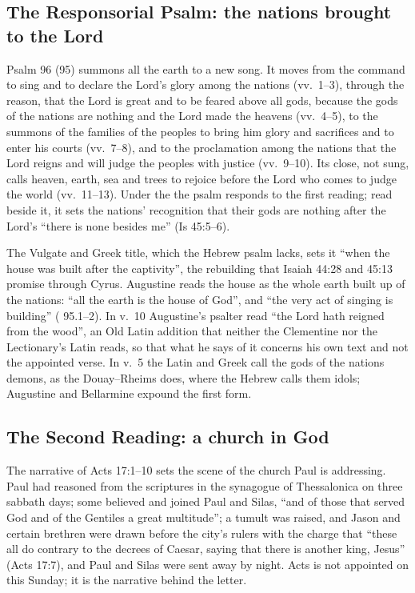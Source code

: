 \subsection{The Responsorial Psalm: the nations brought to the Lord}

Psalm 96 (95) summons all the earth to a new song. It moves from the command to
sing and to declare the Lord's glory among the nations (vv.~1--3), through the
reason, that the Lord is great and to be feared above all gods, because the
gods of the nations are nothing and the Lord made the heavens (vv.~4--5), to
the summons of the families of the peoples to bring him glory and sacrifices
and to enter his courts (vv.~7--8), and to the proclamation among the nations
that the Lord reigns and will judge the peoples with justice (vv.~9--10). Its
close, not sung, calls heaven, earth, sea and trees to rejoice before the Lord
who comes to judge the world (vv.~11--13). Under the  the psalm responds to the first reading; read beside it, it sets
the nations' recognition that their gods are nothing after the Lord's ``there
is none besides me'' (Is 45:5--6).

The Vulgate and Greek title, which the Hebrew psalm lacks, sets it ``when the
house was built after the captivity'', the rebuilding that Isaiah 44:28 and
45:13 promise through Cyrus. Augustine reads the house as the whole earth
built up of the nations: ``all the earth is the house of God'', and ``the very
act of singing is building'' ( 95.1--2). In
v.~10 Augustine's psalter read ``the Lord hath reigned from the wood'', an Old
Latin addition that neither the Clementine nor the Lectionary's Latin reads,
so that what he says of it concerns his own text and not the appointed verse.
In v.~5 the Latin and Greek call the gods of the nations demons, as the
Douay--Rheims does, where the Hebrew calls them idols; Augustine and
Bellarmine expound the first form.

\subsection{The Second Reading: a church in God}

The narrative of Acts 17:1--10 sets the scene of the church Paul is
addressing. Paul had reasoned from the scriptures in the synagogue of
Thessalonica on three sabbath days; some believed and joined Paul and Silas,
``and of those that served God and of the Gentiles a great multitude''; a
tumult was raised, and Jason and certain brethren were drawn before the city's
rulers with the charge that ``these all do
contrary to the decrees of Caesar, saying that there is another king, Jesus''
(Acts 17:7), and Paul and Silas were sent away by night. Acts is not appointed
on this Sunday; it is the narrative behind the letter.


